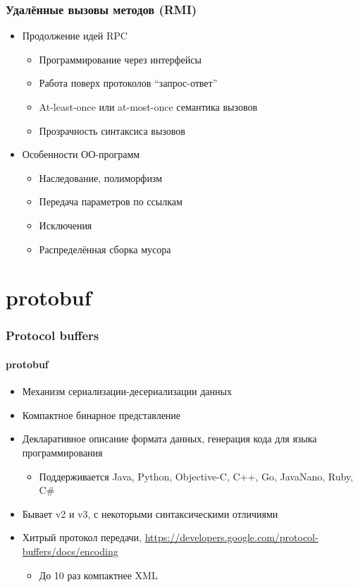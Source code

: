 \documentclass[xetex,mathserif,serif]{beamer}
\begin{document}
    \begin{frame}
        \frametitle{Удалённые вызовы методов (RMI)}
        \begin{itemize}
            \item Продолжение идей RPC
            \begin{itemize}
                \item Программирование через интерфейсы
                \item Работа поверх протоколов ``запрос-ответ''
                \item At-least-once или at-most-once семантика вызовов
                \item Прозрачность синтаксиса вызовов
            \end{itemize}
            \item Особенности ОО-программ
            \begin{itemize}
                \item Наследование, полиморфизм
                \item Передача параметров по ссылкам
                \item Исключения
                \item Распределённая сборка мусора
            \end{itemize}
        \end{itemize}
    \end{frame}

    \section{protobuf}

    \begin{frame}
        \frametitle{Protocol buffers}
        \framesubtitle{protobuf}
        \begin{itemize}
            \item Механизм сериализации-десериализации данных
            \item Компактное бинарное представление
            \item Декларативное описание формата данных, генерация кода для языка программирования
            \begin{itemize}
                \item Поддерживается Java, Python, Objective-C, C++, Go, JavaNano, Ruby, C\#
            \end{itemize}
            \item Бывает v2 и v3, с некоторыми синтаксическими отличиями
            \item Хитрый протокол передачи, \url{https://developers.google.com/protocol-buffers/docs/encoding}
            \begin{itemize}
                \item До 10 раз компактнее XML 
            \end{itemize}
        \end{itemize}
    \end{frame}
\end{document}
